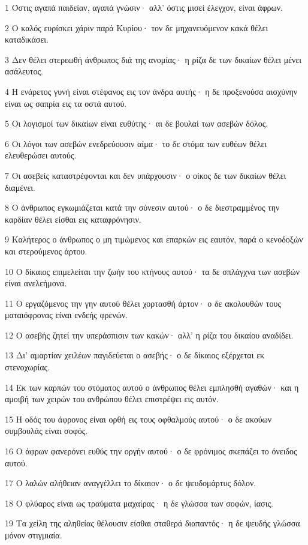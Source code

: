 \par 1 Όστις αγαπά παιδείαν, αγαπά γνώσιν· αλλ' όστις μισεί έλεγχον, είναι άφρων.
\par 2 Ο καλός ευρίσκει χάριν παρά Κυρίου· τον δε μηχανευόμενον κακά θέλει καταδικάσει.
\par 3 Δεν θέλει στερεωθή άνθρωπος διά της ανομίας· η ρίζα δε των δικαίων θέλει μένει ασάλευτος.
\par 4 Η ενάρετος γυνή είναι στέφανος εις τον άνδρα αυτής· η δε προξενούσα αισχύνην είναι ως σαπρία εις τα οστά αυτού.
\par 5 Οι λογισμοί των δικαίων είναι ευθύτης· αι δε βουλαί των ασεβών δόλος.
\par 6 Οι λόγοι των ασεβών ενεδρεύουσιν αίμα· το δε στόμα των ευθέων θέλει ελευθερώσει αυτούς.
\par 7 Οι ασεβείς καταστρέφονται και δεν υπάρχουσιν· ο οίκος δε των δικαίων θέλει διαμένει.
\par 8 Ο άνθρωπος εγκωμιάζεται κατά την σύνεσιν αυτού· ο δε διεστραμμένος την καρδίαν θέλει είσθαι εις καταφρόνησιν.
\par 9 Καλήτερος ο άνθρωπος ο μη τιμώμενος και επαρκών εις εαυτόν, παρά ο κενοδοξών και στερούμενος άρτου.
\par 10 Ο δίκαιος επιμελείται την ζωήν του κτήνους αυτού· τα δε σπλάγχνα των ασεβών είναι ανελεήμονα.
\par 11 Ο εργαζόμενος την γην αυτού θέλει χορτασθή άρτον· ο δε ακολουθών τους ματαιόφρονας είναι ενδεής φρενών.
\par 12 Ο ασεβής ζητεί την υπεράσπισιν των κακών· αλλ' η ρίζα του δικαίου αναδίδει.
\par 13 Δι' αμαρτίαν χειλέων παγιδεύεται ο ασεβής· ο δε δίκαιος εξέρχεται εκ στενοχωρίας.
\par 14 Εκ των καρπών του στόματος αυτού ο άνθρωπος θέλει εμπλησθή αγαθών· και η αμοιβή των χειρών του ανθρώπου θέλει επιστρέψει εις αυτόν.
\par 15 Η οδός του άφρονος είναι ορθή εις τους οφθαλμούς αυτού· ο δε ακούων συμβουλάς είναι σοφός.
\par 16 Ο άφρων φανερόνει ευθύς την οργήν αυτού· ο δε φρόνιμος σκεπάζει το όνειδος αυτού.
\par 17 Ο λαλών αλήθειαν αναγγέλλει το δίκαιον· ο δε ψευδομάρτυς δόλον.
\par 18 Ο φλύαρος είναι ως τραύματα μαχαίρας· η δε γλώσσα των σοφών, ίασις.
\par 19 Τα χείλη της αληθείας θέλουσιν είσθαι σταθερά διαπαντός· η δε ψευδής γλώσσα μόνον στιγμιαία.
